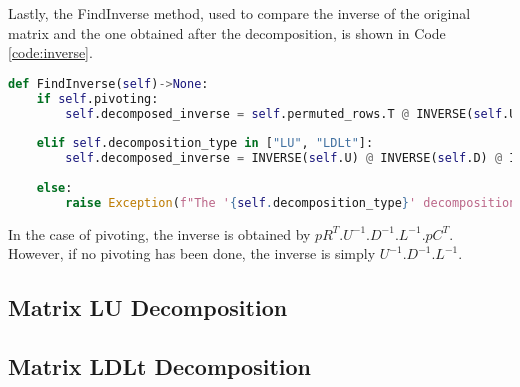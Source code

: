 Lastly, the FindInverse method, used to compare the inverse of the original matrix and the one obtained after the decomposition, is shown in Code \ref{code:inverse}.
\begin{lstlisting}[language=Python, caption={FindInverse method.}, label={code:inverse}]
def FindInverse(self)->None:
    if self.pivoting:
        self.decomposed_inverse = self.permuted_rows.T @ INVERSE(self.U) @ INVERSE(self.D) @ INVERSE(self.L) @ self.permuted_cols.T
    
    elif self.decomposition_type in ["LU", "LDLt"]:
        self.decomposed_inverse = INVERSE(self.U) @ INVERSE(self.D) @ INVERSE(self.L)
    
    else:
        raise Exception(f"The '{self.decomposition_type}' decomposition is not valid.")
\end{lstlisting}

In the case of pivoting, the inverse is obtained by $pR^T.U^{-1}.D^{-1}.L^{-1}.pC^T$. However, if no pivoting has been done, the inverse is simply $U^{-1}.D^{-1}.L^{-1}$.

\subsection{Matrix LU Decomposition} \label{sec:lu}

\subsection{Matrix LDLt Decomposition} \label{sec:ldlt}